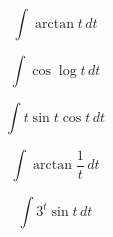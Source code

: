 \documentclass[12pt, letterpaper]{article}
\begin{document}
$$ \int \arctan{t} \, dt $$

\vspace*{0.7in}

$$ \int \cos{\log{t}} \, dt $$

\vspace*{0.7in}

$$ \int t\sin{t}\cos{t} \, dt $$

\vspace*{0.7in}

$$ \int \arctan{\frac{1}{t}} \, dt $$

\vspace*{0.7in}

$$ \int 3^{t}\sin{t} \, dt $$
\end{document}
